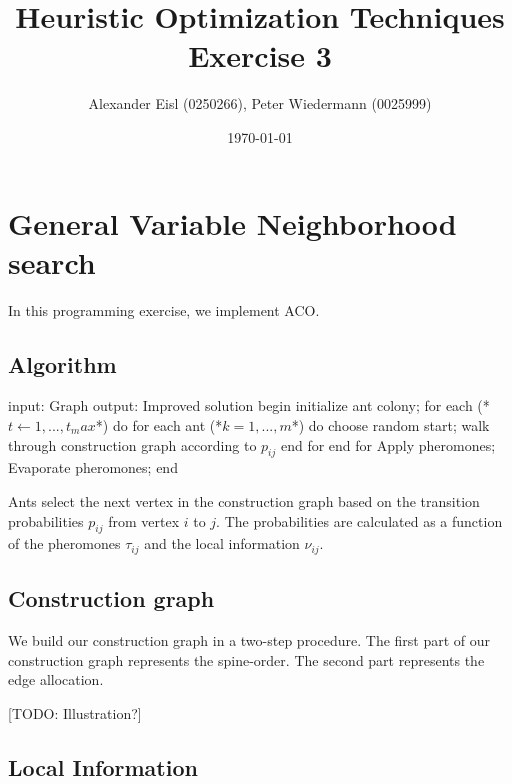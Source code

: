 \documentclass{scrartcl}
\author{Alexander Eisl (0250266), Peter Wiedermann (0025999)}
\date{\today}
\title{Heuristic Optimization Techniques \\ Exercise 3}
\begin{document}
\maketitle


\section{General Variable Neighborhood search}
\label{sec:general_vns}

In this programming exercise, we implement ACO.


\subsection{Algorithm}

\begin{algorithm}[caption={Local search}]
    input: Graph 
    output: Improved solution
    begin
        initialize ant colony;
        for each (*$t \leftarrow 1,...,t_max$*) do
      	    for each ant (*$k = 1,...,m$*) do
               choose random start;
               walk through construction graph according to $p_{ij}$
            end for
        end for
        Apply pheromones;
        Evaporate pheromones;
    end
\end{algorithm}

Ants select the next vertex in the construction graph based on the
transition probabilities $p_{ij}$ from vertex $i$ to $j$. The
probabilities are calculated as a function of the pheromones
$\tau_{ij}$ and the local information $\nu_{ij}$.



\subsection{Construction graph}
\label{construction_graph}

We build our construction graph in a two-step procedure. The first
part of our construction graph represents the spine-order. The second
part represents the edge allocation.

[TODO: Illustration?]




\subsection{Local Information}
\label{local_information}
\end{document}
